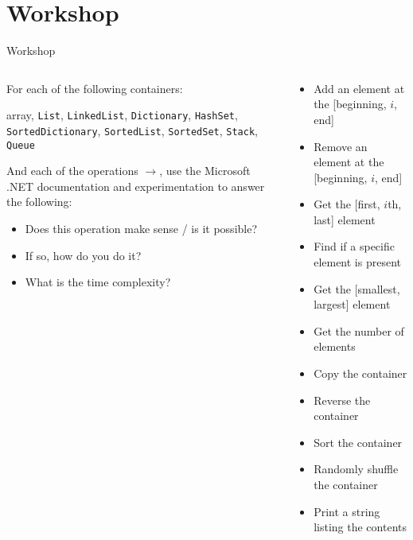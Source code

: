 \part{Workshop}
\frame{\partpage}

\begin{frame}{Workshop}
    \footnotesize
    \begin{columns}
        \begin{column}{0.45\textwidth}
            For each of the following containers:
            
                array, \lstinline{List}, \lstinline{LinkedList},
                \lstinline{Dictionary}, \lstinline{HashSet},
                \lstinline{SortedDictionary}, \lstinline{SortedList},
                \lstinline{SortedSet}, \lstinline{Stack}, \lstinline{Queue}
                
            And each of the operations $\to$, use the Microsoft .NET documentation
            and experimentation to answer the following:
            
            \begin{itemize}
                \item Does this operation make sense / is it possible?
                \item If so, how do you do it?
                \item What is the time complexity?
            \end{itemize}
        \end{column}
        \begin{column}{0.55\textwidth}
            \begin{itemize}
                \item Add an element at the [beginning, $i$, end]
                \item Remove an element at the [beginning, $i$, end]
                \item Get the [first, $i$th, last] element
                \item Find if a specific element is present
                \item Get the [smallest, largest] element
                \item Get the number of elements
                \item Copy the container
                \item Reverse the container
                \item Sort the container
                \item Randomly shuffle the container
                \item Print a string listing the contents
            \end{itemize}
        \end{column}
    \end{columns}
\end{frame}
